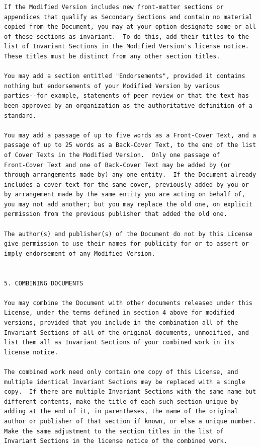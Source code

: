 \documentclass[12pt]{report}
\begin{document}
\begin{verbatim}
If the Modified Version includes new front-matter sections or
appendices that qualify as Secondary Sections and contain no material
copied from the Document, you may at your option designate some or all
of these sections as invariant.  To do this, add their titles to the
list of Invariant Sections in the Modified Version's license notice.
These titles must be distinct from any other section titles.

You may add a section entitled "Endorsements", provided it contains
nothing but endorsements of your Modified Version by various
parties--for example, statements of peer review or that the text has
been approved by an organization as the authoritative definition of a
standard.

You may add a passage of up to five words as a Front-Cover Text, and a
passage of up to 25 words as a Back-Cover Text, to the end of the list
of Cover Texts in the Modified Version.  Only one passage of
Front-Cover Text and one of Back-Cover Text may be added by (or
through arrangements made by) any one entity.  If the Document already
includes a cover text for the same cover, previously added by you or
by arrangement made by the same entity you are acting on behalf of,
you may not add another; but you may replace the old one, on explicit
permission from the previous publisher that added the old one.

The author(s) and publisher(s) of the Document do not by this License
give permission to use their names for publicity for or to assert or
imply endorsement of any Modified Version.


5. COMBINING DOCUMENTS

You may combine the Document with other documents released under this
License, under the terms defined in section 4 above for modified
versions, provided that you include in the combination all of the
Invariant Sections of all of the original documents, unmodified, and
list them all as Invariant Sections of your combined work in its
license notice.

The combined work need only contain one copy of this License, and
multiple identical Invariant Sections may be replaced with a single
copy.  If there are multiple Invariant Sections with the same name but
different contents, make the title of each such section unique by
adding at the end of it, in parentheses, the name of the original
author or publisher of that section if known, or else a unique number.
Make the same adjustment to the section titles in the list of
Invariant Sections in the license notice of the combined work.


\end{verbatim}
\end{document}
